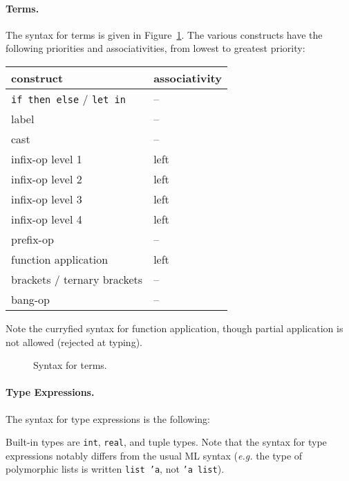 \paragraph{Terms.}
The syntax for terms is given in Figure~\ref{fig:bnf:term}.
The various constructs have the following priorities and
associativities, from lowest to greatest priority:
\begin{center}
  \begin{tabular}{|l|l|}
    \hline
    construct & associativity \\
    \hline\hline
    \texttt{if then else} / \texttt{let in} & -- \\
    label & -- \\
    cast  & -- \\
    infix-op level 1 & left \\
    infix-op level 2 & left \\
    infix-op level 3 & left \\
    infix-op level 4 & left \\
    prefix-op     & --   \\
    function application & left \\
    brackets / ternary brackets & -- \\
    bang-op       & --   \\
    \hline
  \end{tabular}
\end{center}

Note the curryfied syntax for function application, though partial
application is not allowed (rejected at typing).

\begin{figure}
  \begin{center}\framebox{}\end{center}
  \caption{Syntax for terms.}
\label{fig:bnf:term}
\end{figure}

\paragraph{Type Expressions.} The syntax for type expressions is the following:
\begin{center}\framebox{}\end{center}
Built-in types are \texttt{int}, \texttt{real}, and tuple types.
Note that the syntax for type
expressions notably differs from the usual ML syntax (\emph{e.g.} the
type of polymorphic lists is written \texttt{list 'a}, not \texttt{'a list}).

